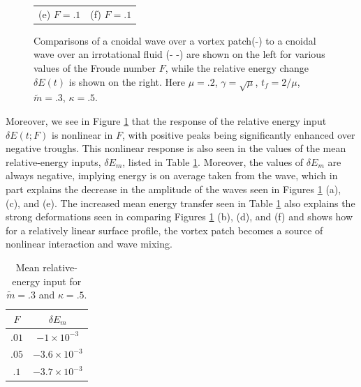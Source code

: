\documentclass[a4paper,11pt]{article}
\begin{document}
\begin{figure}
\begin{tabular}{cc}
(e)  $F=.1$ & (f)  $F=.1$
\end{tabular}
\caption{Comparisons of a cnoidal wave over a vortex patch(-) to a cnoidal wave over an irrotational fluid (- -) are shown on the left for various values of the Froude number $F$, while the relative energy change $\delta E(t)$ is shown on the right.  Here $\mu=.2$, $\gamma=\sqrt{\mu}$, $t_{f}=2/\mu$, $\tilde{m}=.3$, $\kappa = .5$.}
\label{fig:lowsolwave}
\end{figure}

Moreover, we see in Figure \ref{fig:lowsolwave} that the response of the relative energy input $\delta E(t;F)$ is nonlinear in $F$, with positive peaks being significantly enhanced over negative troughs.  This nonlinear response is also seen in the values of the mean relative-energy inputs, $\delta E_{m}$, listed in Table \ref{tab:lowsolmean}.  Moreover, the values of $\delta E_{m}$ are always negative, implying energy is on average taken from the wave, which in part explains the decrease in the amplitude of the waves seen in Figures \ref{fig:lowsolwave} (a), (c), and (e).  The increased mean energy transfer seen in Table \ref{tab:lowsolmean} also explains the strong deformations seen in comparing Figures \ref{fig:lowsolwave} (b), (d), and (f) and shows how for a relatively linear surface profile, the vortex patch becomes a source of nonlinear interaction and wave mixing.    
\begin{table}
\centering
\begin{tabular}{c|c}
$F$ & $\delta E_{m}$ \\
\hline
$.01$ & $-1\times 10^{-3}$\\
$.05$ & $-3.6\times 10^{-3}$\\
$.1$ & $-3.7\times 10^{-3}$
\end{tabular}
\caption{Mean relative-energy input for $\tilde{m}=.3$ and $\kappa=.5$.}
\label{tab:lowsolmean}
\end{table}
\end{document}
